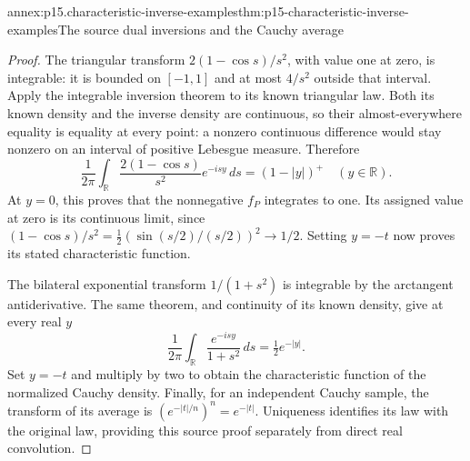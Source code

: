 \begin{annexitem}{annex:p15.characteristic-inverse-examples}{thm:p15-characteristic-inverse-examples}{The source dual inversions and the Cauchy average}
\begin{proof}
The triangular transform
\(2(1-\cos s)/s^2\), with value one at zero, is integrable:
it is bounded on \([-1,1]\) and at most \(4/s^2\)
outside that interval. Apply the integrable inversion
theorem to its known triangular law.
Both its known density and the inverse density are
continuous, so their almost-everywhere equality is
equality at every point: a nonzero continuous
difference would stay nonzero on an interval of
positive Lebesgue measure. Therefore
\[
 \frac1{2\pi}\int_{\mathbb R}
       \frac{2(1-\cos s)}{s^2}e^{-isy}\,ds=(1-|y|)^+
                       \quad(y\in\mathbb R).
\]
At \(y=0\), this proves that the nonnegative \(f_P\)
integrates to one. Its assigned value at zero is its
continuous limit, since
\((1-\cos s)/s^2=\tfrac12(\sin(s/2)/(s/2))^2\to1/2\).
Setting \(y=-t\) now proves its stated characteristic
function.

The bilateral exponential transform \(1/(1+s^2)\)
is integrable by the arctangent antiderivative.
The same theorem, and continuity of its known density,
give at every real \(y\)
\[
 \frac1{2\pi}\int_{\mathbb R}
           \frac{e^{-isy}}{1+s^2}\,ds=\tfrac12e^{-|y|}.
\]
Set \(y=-t\) and multiply by two to obtain the
characteristic function of the normalized Cauchy
density. Finally, for an independent Cauchy sample,
the transform of its average is
\((e^{-|t|/n})^n=e^{-|t|}\).
Uniqueness identifies its law with the original law,
providing this source proof separately from direct
real convolution.
\end{proof}
\end{annexitem}

